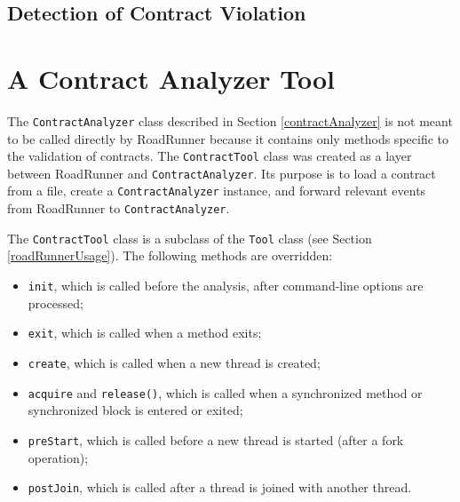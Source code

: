 \subsection{Detection of Contract Violation}
\label{violations}


{\color{blue}\lipsum[2]}


\section{A Contract Analyzer Tool}
\label{contractTool}

The \texttt{ContractAnalyzer} class described in Section \ref{contractAnalyzer}
is not meant to be called directly by RoadRunner because it contains only
methods specific to the validation of contracts. The \texttt{ContractTool} class
was created as a layer between RoadRunner and \texttt{ContractAnalyzer}. Its
purpose is to load a contract from a file, create a \texttt{ContractAnalyzer}
instance, and forward relevant events from RoadRunner to
\texttt{ContractAnalyzer}.

The \texttt{ContractTool} class is a subclass of the \texttt{Tool} class (see
Section \ref{roadRunnerUsage}). The following methods are overridden:
\begin{itemize}
    \item \texttt{init}, which is called before the analysis, after
        command-line options are processed;
    \item \texttt{exit}, which is called when a method exits;
    \item \texttt{create}, which is called when a new thread is created;
    \item \texttt{acquire} and \texttt{release()}, which is called when a
        synchronized method or synchronized block is entered or exited;
    \item \texttt{preStart}, which is called before a new thread is started
        (after a fork operation);
    \item \texttt{postJoin}, which is called after a thread is joined with
        another thread.
\end{itemize}

